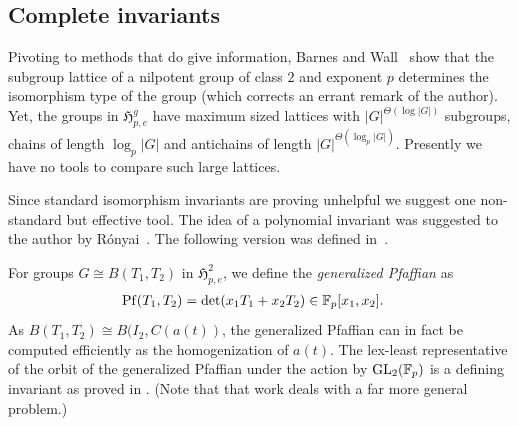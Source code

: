 \documentclass[11pt]{article}
\numberwithin{equation}{section}
\theoremstyle{definition}
\theoremstyle{plain}
\numberwithin{equation}{section}
\theoremstyle{plain}       %
\theoremstyle{remark}
\theoremstyle{definition}
\numberwithin{figure}{section}
\numberwithin{table}{section}
\newcommand{\mygroups}{\mathfrak{H}}
\newcommand{\bbF}{\mathbb{F}}  %
\begin{document}
\subsection{Complete invariants}
Pivoting to methods that do give information, 
Barnes and Wall~\cite{Barnes-Wall}
show that the subgroup lattice of a nilpotent group of class $2$ and exponent
$p$ determines the isomorphism type of the group (which corrects an errant
remark of the author).  Yet, the groups in $\mygroups_{p,e}^g$ have maximum
sized lattices with $|G|^{\Theta(\log |G|)}$ subgroups,
chains of length $\log_p |G|$ and antichains of length
$|G|^{\Theta(\log_p |G|)}$.  Presently we have no
tools to compare such large lattices.

Since standard isomorphism invariants are proving unhelpful we suggest one
non-standard but effective tool.  The idea of a polynomial invariant was
suggested to the author by R\'onyai~\cite{Ronyai:private}.  The following
version was defined in~\cite{BMW}.

For groups $G\cong B(T_1,T_2)$ in $\mygroups_{p,e}^2$, we define the
\emph{generalized Pfaffian} as 
\begin{align}\label{def:Pfaffian}
	{\rm Pf}(T_1,T_2) & = \det (x_1 T_1+x_2 T_2)
	\in \bbF_p[x_1,x_2].
\end{align}
As $B(T_1,T_2)\cong B(I_2,C(a(t))$, the generalized Pfaffian can in fact be
computed efficiently as the homogenization of $a(t)$.  The lex-least
representative of the orbit of the generalized Pfaffian under the action by
${\rm GL}_2(\bbF_{p})$ is a defining invariant as proved in \cite{BMW}.  
(Note that
that   %
work deals with a far more general problem.)
\end{document}
